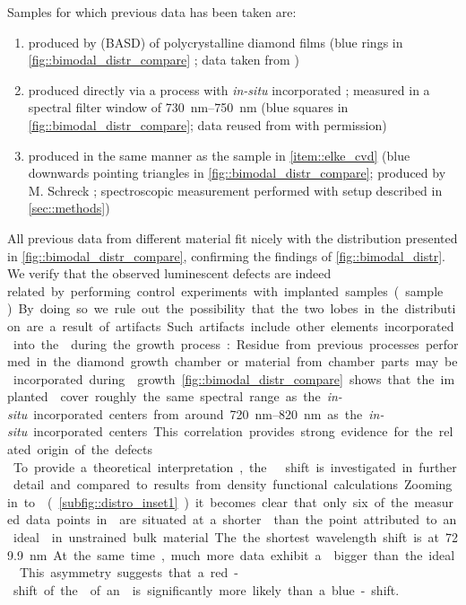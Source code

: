	Samples for which previous data has been taken are:
	\begin{enumerate}
		\item \nds produced by \basd (BASD) of polycrystalline \CVD diamond films (blue rings in \autoref{fig::bimodal_distr_compare} \cite{Neu2011a}; data taken from \cite{Benedikter2017a})
		\item \label{item::elke_cvd}\nds produced directly via a \CVD process with \textit{in-situ} incorporated \sivs; measured in a spectral filter window of \SIrange{730}{750}{nm} (blue squares in \autoref{fig::bimodal_distr_compare}; data reused from \cite{Neu2012} with permission)
		\item \nds produced in the same manner as the \CVD sample in \ref{item::elke_cvd} (blue downwards pointing triangles in \autoref{fig::bimodal_distr_compare}; produced by M. Schreck \cite{Neu2011b}; spectroscopic measurement performed with setup described in \autoref{sec::methods})
	\end{enumerate}
	
	All previous data from different \nd material fit nicely with the \ZPL distribution presented in \autoref{fig::bimodal_distr_compare}, confirming the findings of \autoref{fig::bimodal_distr}.
	\\
	We verify that the observed luminescent defects are indeed \si related by performing control experiments with \si implanted samples (sample \implantedTao).
	By doing so we rule out the possibility that the two lobes in the distribution are a result of artifacts.
	Such artifacts include other elements incorporated into the \nds during the growth process: Residue from previous processes performed in the diamond growth chamber or material from chamber parts may be incorporated during \nd growth.
	\autoref{fig::bimodal_distr_compare} shows that the implanted \sivs cover roughly the same spectral range as the \textit{in-situ} incorporated centers from around \SIrange{720}{820}{nm} as the \textit{in-situ} incorporated centers.
	This correlation provides strong evidence for the \si related origin of the defects.
	\\
	To provide a theoretical interpretation, the \ZPL \cwl shift is investigated in further detail and compared to results from density functional calculations.
	Zooming in to \vl (\autoref{subfig::distro_inset1}) it becomes clear that only six of the measured data points in \vl are situated at a shorter \cwl than the point attributed to an ideal \siv in unstrained bulk material.
	The the shortest wavelength shift is at \SI{729.9}{nm}.
	At the same time, much more data exhibit a \cwl bigger than the ideal \siv.
	This asymmetry suggests that a red-shift of the \ZPL of an \siv is significantly more likely than a blue-shift.

